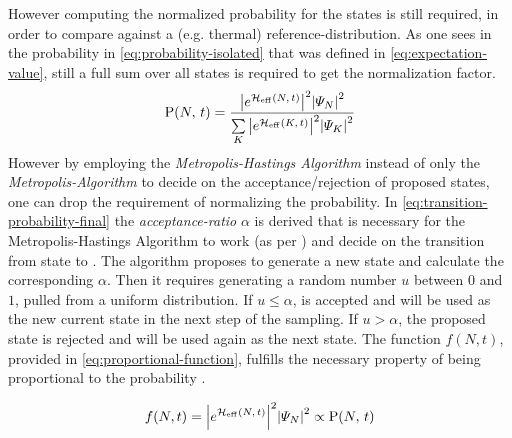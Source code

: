 However computing the normalized probability for the states is still required, in order to compare against a (e.g. thermal) reference-distribution.
As one sees in the probability in \autoref{eq:probability-isolated} that was defined in \autoref{eq:expectation-value}, still a full sum over all states is required to get the normalization factor.
\begin{equation}
    \label{eq:probability-isolated}
    \probabilityOf{N}{t} = \frac{
        \absSquare{e^{\HeffOft}} \absSquare{\psiN} 
    }{
        \lsum[K] \absSquare{e^{\HeffOft[K]}} \absSquare{\psiN[K]} 
    }
\end{equation}
However by employing the \emph{Metropolis-Hastings Algorithm} instead of only the \emph{Metropolis-Algorithm} to decide on the acceptance/rejection of proposed states, one can drop the requirement of normalizing the probability.
In \autoref{eq:transition-probability-final} the \emph{acceptance-ratio} $\alpha$ is derived that is necessary for the Metropolis-Hastings Algorithm to work (as per \cite{metropolisHastingsAlgorithmGeneral}) and decide on the transition from state \ketN[N] to .
The algorithm proposes to generate a new state  and calculate the corresponding $\alpha$. Then it requires generating a random number $u$ between $0$ and $1$, pulled from a uniform distribution.
If $u \leq \alpha$,  is accepted and will be used as the new current state in the next step of the sampling. 
If $u>\alpha$, the proposed state is rejected and \ketN[N] will be used again as the next state.
The function $f(N,t)$, provided in \autoref{eq:proportional-function}, fulfills the necessary property of being proportional to the probability  .

\begin{equation}
    \label{eq:proportional-function}
    f(N,t) = \absSquare{e^{\HeffOft}} \absSquare{\psiN} \propto \probabilityOf{N}{t}
\end{equation}


